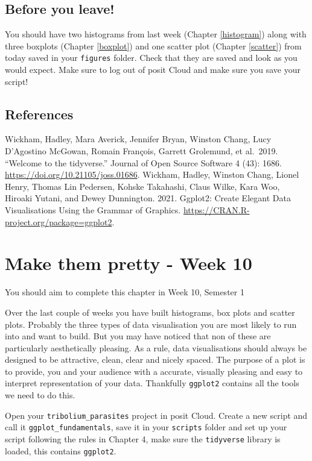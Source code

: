 \documentclass[
]{book}
\begin{document}
\section{Before you leave!}\label{before-you-leave-3}

You should have two histograms from last week (Chapter \ref{histogram}) along with three boxplots (Chapter \ref{boxplot}) and one scatter plot (Chapter \ref{scatter}) from today saved in your \texttt{figures} folder. Check that they are saved and look as you would expect. Make sure to log out of posit Cloud and make sure you save your script!

\section{References}\label{references-4}

Wickham, Hadley, Mara Averick, Jennifer Bryan, Winston Chang, Lucy D'Agostino McGowan, Romain François, Garrett Grolemund, et al.~2019. ``Welcome to the tidyverse.'' Journal of Open Source Software 4 (43): 1686. \url{https://doi.org/10.21105/joss.01686}.
Wickham, Hadley, Winston Chang, Lionel Henry, Thomas Lin Pedersen, Kohske Takahashi, Claus Wilke, Kara Woo, Hiroaki Yutani, and Dewey Dunnington. 2021. Ggplot2: Create Elegant Data Visualisations Using the Grammar of Graphics. \url{https://CRAN.R-project.org/package=ggplot2}.

\chapter{Make them pretty - Week 10}\label{pretty-figs-p1}

You should aim to complete this chapter in Week 10, Semester 1

Over the last couple of weeks you have built histograms, box plots and scatter plots. Probably the three types of data visualisation you are most likely to run into and want to build. But you may have noticed that non of these are particularly aesthetically pleasing. As a rule, data visualisations should always be designed to be attractive, clean, clear and nicely spaced. The purpose of a plot is to provide, you and your audience with a accurate, visually pleasing and easy to interpret representation of your data. Thankfully \texttt{ggplot2} contains all the tools we need to do this.

Open your \texttt{tribolium\_parasites} project in posit Cloud. Create a new script and call it \texttt{ggplot\_fundamentals}, save it in your \texttt{scripts} folder and set up your script following the rules in Chapter 4, make sure the \texttt{tidyverse} library is loaded, this contains \texttt{ggplot2}.
\end{document}
